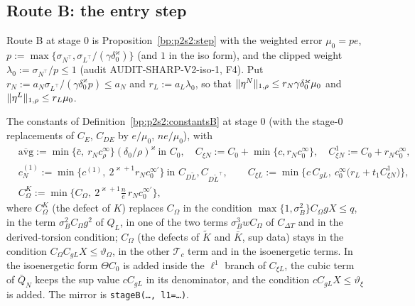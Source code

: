 \subsection{Route B: the entry step}\label{bp:p2s2l1:sec-B}

Route B at stage $0$ is Proposition~\ref{bp:p2s2:step} with the weighted error $\mu_0=pe$, $p:=\max\{\sigma_{N^\top},\sigma_{L^\top}/(\gamma\delta_0^\varkappa)\}$ (and $1$ in the iso
form), and the clipped weight $\lambda_0:=\sigma_{N^\top}/p\le1$ (audit AUDIT-SHARP-V2-iso-1, F4). Put $r_N:=a_N\sigma_{L^\top}/(\gamma\delta_0^\varkappa p)\le a_N$ and
$r_L:=a_L\lambda_0$, so that $\lVert \eta^N\rVert_{1,\rho}\le r_N\gamma\delta_0^\varkappa\mu_0$ and $\lVert \eta^L\rVert_{1,\rho}\le r_L\mu_0$.

\begin{definition}\label{bp:p2s2l1:constB}
The constants of Definition~\ref{bp:p2s2:constantsB} at stage $0$ (with the stage-$0$ replacements of $C_E$, $C_{DE}$ by $e/\mu_0$, $ne/\mu_0$), with
\begin{align*}
&\overline{\mathrm{avg}}:=\min\{\bar c,\ r_Nc^\infty_\rho\}(\delta_0/\rho)^\varkappa\ \text{in }C_0,\quad
C_{\xi N}:=C_0+\min\{c,r_Nc^\infty_0\},\quad C^1_{\xi N}:=C_0+r_Nc^\infty_0,\\
&c^{(1)}_N:=\min\{c^{(1)},\ 2^{\varkappa+1}r_Nc^{\infty\prime}_0\}\ \text{in }C_{D\tilde L},C_{D\tilde L^\top},\qquad
C_{\xi L}:=\min\bigl\{c\,C_{gL},\ c^\infty_0\bigl(r_L+t_1C^1_{\xi N}\bigr)\bigr\},\\
&C^K_\Omega:=\min\{C_\Omega,\ 2^{\varkappa+1}\tfrac ne\,r_Nc^{\infty\prime}_0\},
\end{align*}
where $C^K_\Omega$ (the defect of $K$) replaces $C_\Omega$ in the condition $\max\{1,\sigma_B^2\}C_\Omega g X\le q$, in the term $\sigma_B^2C_\Omega g^2$ of $Q_L$, in one of the
two terms $\sigma_B^3wC_\Omega$ of $C_{\Delta T}$ and in the derived-torsion condition; $C_\Omega$ (the defects of $\tilde K$ and $\bar K$, sup data) stays in the
condition $C_\Omega C_{gL}X\le\vartheta_\Omega$, in the other $\mathcal T_c$ term and in the isoenergetic terms. In the isoenergetic form $\Theta C_0$ is added inside the
$\ell^1$ branch of $C_{\xi L}$, the cubic term of $\bar Q_N$ keeps the sup value $cC_{gL}$ in its denominator, and the condition $cC_{gL}X\le\vartheta_\xi$ is
added. The mirror is \texttt{stageB(\dots, l1=\dots)}.
\end{definition}

